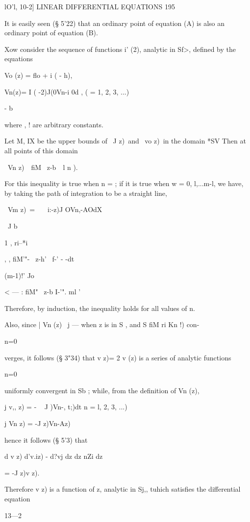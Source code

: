 lO'l, 10-2] LINEAR DIFFERENTIAL EQUATIONS 195 

It is easily seen (§ 5'22) that an ordinary point of equation (A) is also 
an ordinary point of equation (B). 

Xow consider the sequence of functions i' (2), analytic in Sf>, defined by 
the equations 

Vo (z) = flo +  i (  - h), 



Vn(z)=  I ( -2)J(0Vn-i 0d , (  = 1, 2, 3, ...) 

- b 

where   ,  ! are arbitrary constants. 

Let M, IX be the upper bounds of \ J z)\ and \ vo z)\ in the domain *SV 
Then at all points of this domain 

\ Vn z)\ \  fiM \ z-b\ \  l n ). 

For this inequality is true when n = ; if it is true when w = 0, l,...m-l, 
we have, by taking the path of integration to be a straight line, 

\ Vm z)\ = \ \ \ i:-z)J OVn,-AOdX 

\ J b 

1 , ri--*i 

  ,   , fiM'"- \ z-h' \ f-' - -dt 

(m-1)!'  Jo 

< — : fiM"  \ z-b I-'". 
ml ' 

Therefore, by induction, the inequality holds for all values of n. 

Also, since | Vn (z) \   j — when z is in S , and S fiM ri Kn !) con- 

    n=0 

verges, it follows (§ 3"34) that v z)= 2 v  (z) is a series of analytic functions 

n=0 

uniformly convergent in Sb ; while, from the definition of Vn (z), 

j v,, z) = - ~ J \;)Vn-, t;)dt  n = l, 2, 3, ...) 

j Vn z) = -J z)Vn-Az)\ 

hence it follows (§ 5'3) that 

d v z)   d'v.iz)   - d?vj  
dz  dz  nZi dz  

= -J z)v z). 

Therefore v z) is a function of z, analytic in Sj,, tuhich satisfies the 
differential equation 

13—2 



